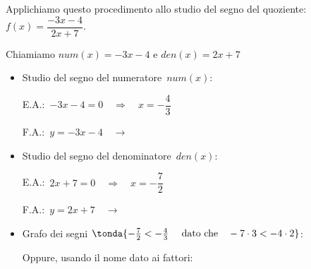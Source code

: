\begin{esempio}
Applichiamo questo procedimento allo studio del segno del quoziente: \\
\(f(x)=\dfrac{-3x-4}{2x+7}\).

Chiamiamo \(num(x)=-3x-4\) \quad e \quad \(den(x)=2x+7\)

\begin{itemize} [noitemsep]
 \item Studio del segno del numeratore~\(num(x)\):\\
 \begin{minipage}{.45\textwidth}
  E.A.:~\(-3x-4 = 0 \quad \Rightarrow \quad x = -\dfrac{4}{3}\)
 \end{minipage}
 \begin{minipage}{.25\textwidth}
  F.A.:~\(y = -3x-4 \quad \rightarrow\)
 \end{minipage}
 \begin{minipage}{.3\textwidth}
 \end{minipage}
 \item Studio del segno del denominatore~\(den(x)\):\\
 \begin{minipage}{.45\textwidth}
  E.A.:~\(2x+7 = 0 \quad \Rightarrow \quad x=-\dfrac{7}{2}\)
 \end{minipage}
 \begin{minipage}{.25\textwidth}
  F.A.:~\(y = 2x+7 \quad \rightarrow\)
 \end{minipage}
 \begin{minipage}{.3\textwidth}
 \end{minipage}
 \item Grafo dei segni \(\tonda{-\frac{7}{2} < -\frac{4}{3}\quad 
 \text{ dato che} \quad -7 \cdot 3 < -4 \cdot 2}\):
 
 \segnoquozientea
 
 Oppure, usando il nome dato ai fattori: 
 

\end{itemize}
\end{esempio}
